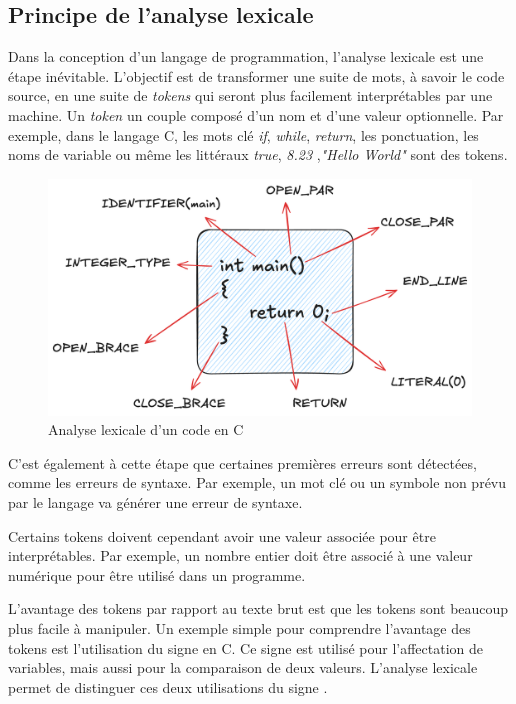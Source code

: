 \subsection{Principe de l'analyse lexicale}
Dans la conception d'un langage de programmation, l'analyse lexicale est une étape inévitable. L'objectif est de transformer une suite de mots, à savoir le code source, en une suite de \textit{tokens} qui seront plus facilement interprétables par une machine. Un \textit{token} un couple composé d'un nom et d'une valeur optionnelle. Par exemple, dans le langage C, les mots clé \textit{if}, \textit{while}, \textit{return}, les ponctuation, les noms de variable ou même les littéraux \textit{true}, \textit{8.23} ,\textit{"Hello World"} sont des tokens.

\begin{figure}[H]
    \centering
    \includegraphics[width=12cm]{figures/syntaxe/lexing.png}
    \caption{Analyse lexicale d'un code en C}
    \label{fig2}
\end{figure}

C'est également à cette étape que certaines premières erreurs sont détectées, comme les erreurs de syntaxe. Par exemple, un mot clé ou un symbole non prévu par le langage va générer une erreur de syntaxe.

Certains tokens doivent cependant avoir une valeur associée pour être interprétables. Par exemple, un nombre entier doit être associé à une valeur numérique pour être utilisé dans un programme.

L'avantage des tokens par rapport au texte brut est que les tokens sont beaucoup plus facile à manipuler. Un exemple simple pour comprendre l'avantage des tokens est l'utilisation du signe \textquote{=} en C. Ce signe est utilisé pour l'affectation de variables, mais aussi pour la comparaison de deux valeurs. L'analyse lexicale permet de distinguer ces deux utilisations du signe \textquote{=}.

